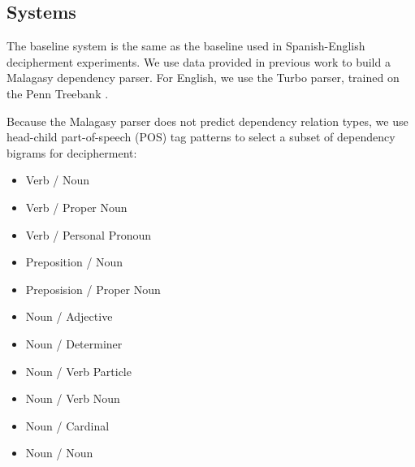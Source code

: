 \subsection{Systems}
The baseline system is the same as the baseline used in Spanish-English decipherment experiments. We use data provided in previous work \cite{dou-vaswani-knight:2014:EMNLP2014} to build a Malagasy dependency parser. For English, we use the Turbo parser, trained on the Penn Treebank \cite{TurboParser}.  

Because the Malagasy parser does not predict dependency relation types, we use head-child part-of-speech (POS) tag patterns to select a subset of dependency bigrams for decipherment: 


\begin{itemize}
\item Verb / Noun
\item Verb / Proper Noun
\item Verb / Personal Pronoun
\item Preposition / Noun
\item Preposision / Proper Noun
\item Noun / Adjective
\item Noun / Determiner
\item Noun / Verb Particle
\item Noun / Verb Noun %
\item Noun / Cardinal
\item Noun / Noun
\end{itemize}

%
%

